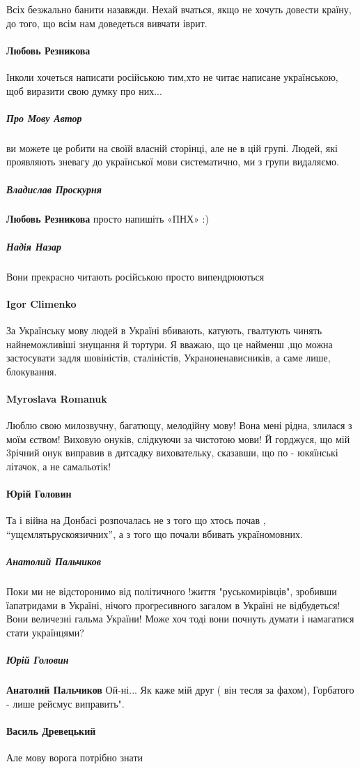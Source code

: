 Всіх безжально банити назавжди. Нехай вчаться, якщо не хочуть довести країну,
до того, що всім нам доведеться вивчати іврит.

\paragraph{Любовь Резникова}

Інколи хочеться написати російською тим,хто не читає написане українською, щоб
виразити свою думку про них...

\subparagraph{Про Мову Автор}

ви можете це робити на своїй власній сторінці, але не в цій групі. Людей, які
проявляють зневагу до української мови систематично, ми з групи видаляємо.

\subparagraph{Владислав Проскурня}

\textbf{Любовь Резникова} просто напишіть «ПНХ» :)

\subparagraph{Надія Назар}

Вони прекрасно читають російською просто випендрюються

\paragraph{Igor Climenko}

За Українську мову людей в Україні вбивають, катують, гвалтують чинять
найнеможливіші знущання й тортури. Я вважаю, що це найменш ,що можна
застосувати задля шовіністів, сталіністів, Украноненависників, а саме лише,
блокування.

\paragraph{Myroslava Romanuk}

Люблю свою милозвучну, багатющу, мелодійну мову! Вона мені рідна, злилася з
моїм єством! Виховую онуків, слідкуючи за чистотою мови! Й горджуся, що мій
3річний онук виправив в дитсадку виховательку, сказавши, що по - юкяїнські
літачок, а не самальотік!

\paragraph{Юрій Головин}

Та і війна на Донбасі розпочалась не з того що хтось почав ,
``ущємлятьрускоязичних'', а з того що почали вбивать україномовних. 

\subparagraph{Анатолий Пальчиков}

Поки ми не відсторонимо від політичного !життя "руськомирівців", зробивши
їапатридами в Україні, нічого прогресивного загалом в Україні не відбудеться!
Вони величезні гальма України! Може хоч тоді вони почнуть думати і намагатися
стати українцями?

\subparagraph{Юрій Головин}
\textbf{Анатолий Пальчиков} Ой-ні... Як каже мій друг ( він тесля за фахом),
Горбатого - лише рейсмус виправить". 

\paragraph{Василь Древецький}
Але мову ворога потрібно знати
